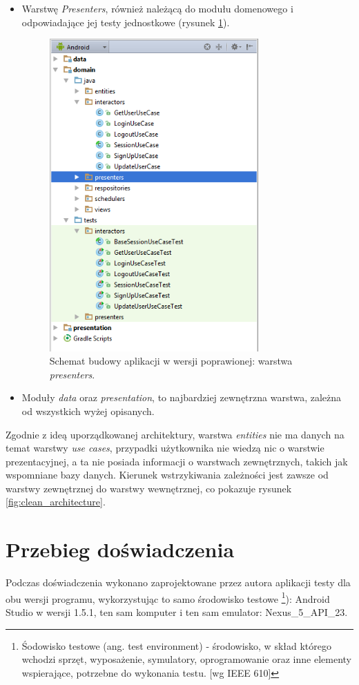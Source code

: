 \begin{itemize}
\item
Warstwę \textit{Presenters}, również należącą do modułu domenowego i odpowiadające jej testy jednostkowe (rysunek \ref{fig:app_cl_presenters}).
\begin{figure}[!htb]
    \centering
    \includegraphics[width=8cm]{imgs/ch6_app_cl_presenters.png}
    \caption
{Schemat budowy aplikacji w wersji poprawionej: warstwa \textit{presenters}.}
    \label{fig:app_cl_presenters}
\end{figure} 

\item
Moduły \textit{data} oraz \textit{presentation}, to najbardziej zewnętrzna warstwa, zależna od wszystkich wyżej opisanych. 
\end{itemize}

Zgodnie z ideą uporządkowanej architektury, warstwa \textit{entities} nie ma danych na temat warstwy \textit{use cases}, przypadki użytkownika nie wiedzą nic o warstwie prezentacyjnej, a ta nie posiada informacji o warstwach zewnętrznych, takich jak wspomniane bazy danych. Kierunek wstrzykiwania zależności jest zawsze od warstwy zewnętrznej do warstwy wewnętrznej, co pokazuje rysunek \ref{fig:clean_architecture}.

\section{Przebieg doświadczenia}
Podczas doświadczenia wykonano zaprojektowane przez autora aplikacji testy dla obu wersji programu, wykorzystując to samo środowisko testowe \footnote{Śodowisko testowe (ang. test environment) - środowisko, w skład którego wchodzi sprzęt, wyposażenie, symulatory, oprogramowanie oraz inne elementy wspierające, potrzebne do wykonania testu. [wg IEEE 610]}): Android Studio w wersji 1.5.1, ten sam komputer i ten sam emulator: Nexus\_5\_API\_23.


